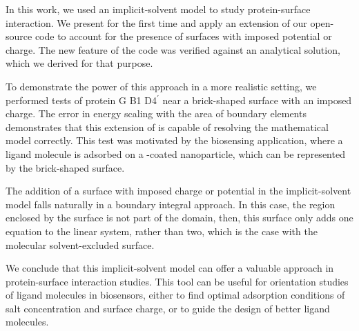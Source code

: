 
In this work, we used an implicit-solvent model to study protein-surface interaction. We present for the first time and apply an extension of our open-source \pygbe code to account for the presence of surfaces with imposed potential or charge. The new feature of the code was verified against an analytical solution, which we derived for that purpose. 

To demonstrate the power of this approach in a more realistic setting, we performed tests of protein G B1 D4$^\prime$ near a brick-shaped surface with an imposed charge. The error in energy scaling with the area of boundary elements demonstrates that this extension of \pygbe is capable of resolving the mathematical model correctly. This test was motivated by the biosensing application, where a ligand molecule is adsorbed on a \sam-coated nanoparticle, which can be represented by the brick-shaped surface.

The addition of a surface with imposed charge or potential in the implicit-solvent model falls naturally in a boundary integral approach. In this case, the region enclosed by the surface is not part of the domain, then, this surface only adds one equation to the linear system, rather than two, which is the case with the molecular solvent-excluded surface.

We conclude that this implicit-solvent model can offer a valuable approach in protein-surface interaction studies. This tool can be useful for orientation studies of ligand molecules in biosensors, either to find optimal adsorption conditions of salt concentration and surface charge, or to guide the design of better ligand molecules. 
